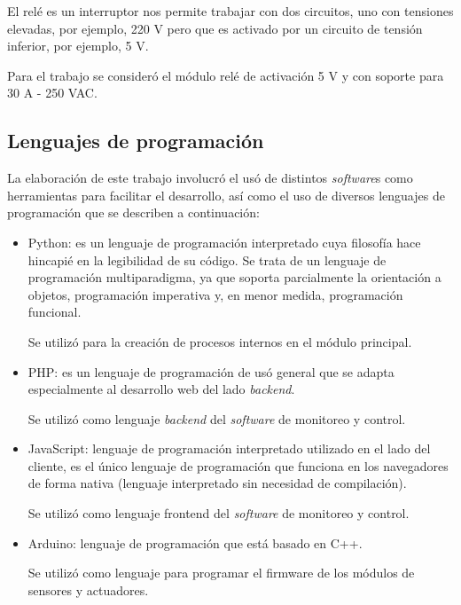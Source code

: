 El relé es un interruptor nos permite trabajar con dos circuitos, uno con tensiones elevadas, por ejemplo, 220 V pero que es activado por un circuito de tensión inferior, por ejemplo, 5 V.

Para el trabajo se consideró el módulo relé de activación 5 V y con soporte para 30 A - 250 VAC.

\subsection{Lenguajes de programación}

La elaboración de este trabajo involucró el usó de distintos \emph{software}s como herramientas para facilitar el desarrollo, así como el uso de diversos lenguajes de programación que se describen a continuación:
\begin{itemize}
\item Python: es un lenguaje de programación interpretado cuya filosofía hace hincapié en la legibilidad de su código. Se trata de un lenguaje de programación multiparadigma, ya que soporta parcialmente la orientación a objetos, programación imperativa y, en menor medida, programación funcional.

Se utilizó para la creación de procesos internos en el módulo principal. 
\item PHP: es un lenguaje de programación de usó general que se adapta especialmente al desarrollo web del lado \emph{backend}.

Se utilizó como lenguaje \emph{backend} del \emph{software} de monitoreo y control.
\item JavaScript: lenguaje de programación interpretado utilizado en el lado del cliente, es el único lenguaje de programación que funciona en los navegadores de forma nativa (lenguaje interpretado sin necesidad de compilación).

Se utilizó como lenguaje frontend del \emph{software} de monitoreo y control.
\item Arduino: lenguaje de programación que está basado en C++.

Se utilizó como lenguaje para programar el firmware de los módulos de sensores y actuadores.
\end{itemize}